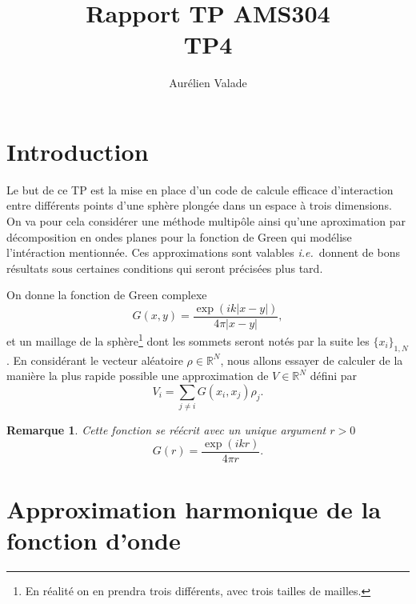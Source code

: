 \documentclass[11pt]{article}
\title{Rapport TP AMS304 \\ TP4}
\author{Aurélien Valade}
\date{}
\newtheorem{rmq}{Remarque}
\newcommand{\ie}{\emph{i.e.}~}
\newcommand{\R}{\mathbb{R}}
\begin{document}
\maketitle

\section{Introduction}

Le but de ce TP est la mise en place d'un code de calcule efficace d'interaction entre différents points d'une sphère plongée dans un espace à
trois dimensions. On va pour cela considérer une méthode multipôle ainsi qu'une aproximation par décomposition en ondes planes pour la
fonction de Green qui modélise l'intéraction mentionnée. Ces approximations sont valables \ie donnent de bons résultats sous certaines
conditions qui seront précisées plus tard.

On donne la fonction de Green complexe
\begin{equation}
  \label{eq:green}
  G(x, y) = \frac{\exp(i k |x-y|)}{4\pi|x-y|},
\end{equation}
et un maillage de la sphère\footnote{En réalité on en prendra trois différents, avec trois tailles de mailles.} dont les sommets seront notés
par la suite les $\{x_i\}_{1, N}$. En considérant le vecteur aléatoire $\rho \in \R^N$, nous allons essayer de calculer de la
manière la plus rapide possible une approximation de $V \in \R^N$ défini par 
\begin{equation}
  \label{eq:goal}
  V_i = \sum_{j\neq i}G(x_i, x_j) \rho_j.
\end{equation}

\begin{rmq}
  Cette fonction se réécrit avec un unique argument $r>0$
  \[
    G(r) = \frac{\exp(i k r)}{4\pi r}.
  \]
\end{rmq}


\section{Approximation harmonique de la fonction d'onde}
\end{document}
